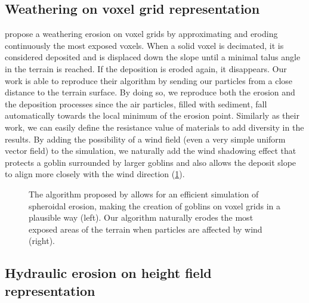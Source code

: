 \subsection{Weathering on voxel grid representation}

\cite{Jones2010} propose a weathering erosion on voxel grids by approximating and eroding continuously the most exposed voxels. When a solid voxel is decimated, it is considered deposited and is displaced down the slope until a minimal talus angle in the terrain is reached. If the deposition is eroded again, it disappears. Our work is able to reproduce their algorithm by sending our particles from a close distance to the terrain surface. By doing so, we reproduce both the erosion and the deposition processes since the air particles, filled with sediment, fall automatically towards the local minimum of the erosion point. Similarly as their work, we can easily define the resistance value of materials to add diversity in the results. By adding the possibility of a wind field (even a very simple uniform vector field) to the simulation, we naturally add the wind shadowing effect that protects a goblin surrounded by larger goblins and also allows the deposit slope to align more closely with the wind direction (\cref{fig:erosion-screen-jones2010}).

\begin{figure}[H]
    \caption[Comparison of rock weathering with \cite{Jones2010}]{The algorithm proposed by \cite{Jones2010} allows for an efficient simulation of spheroidal erosion, making the creation of goblins on voxel grids in a plausible way (left). Our algorithm naturally erodes the most exposed areas of the terrain when particles are affected by wind (right).}
    \label{fig:erosion-screen-jones2010}
\end{figure}

\subsection{Hydraulic erosion on height field representation}

